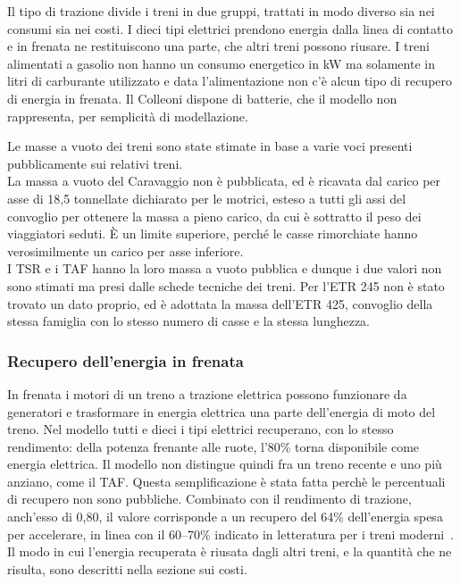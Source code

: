 Il tipo di trazione divide i treni in due gruppi, trattati in modo diverso sia nei consumi sia nei costi. I dieci tipi elettrici prendono energia dalla linea di contatto e in frenata ne restituiscono una parte, che altri treni possono riusare. I treni alimentati a gasolio non hanno un consumo energetico in kW ma solamente in litri di carburante utilizzato e data l'alimentazione non c'è alcun tipo di recupero di energia in frenata. Il Colleoni dispone di batterie, che il modello non rappresenta, per semplicità di modellazione.

Le masse a vuoto dei treni sono state stimate in base a varie voci presenti pubblicamente sui relativi treni.\\
La massa a vuoto del Caravaggio non è pubblicata, ed è ricavata dal carico per asse di 18,5 tonnellate dichiarato per le motrici, esteso a tutti gli assi del convoglio per ottenere la massa a pieno carico, da cui è sottratto il peso dei viaggiatori seduti. È un limite superiore, perché le casse rimorchiate hanno verosimilmente un carico per asse inferiore.\\
I TSR e i TAF hanno la loro massa a vuoto pubblica e dunque i due valori non sono stimati ma presi dalle schede tecniche dei treni.
Per l'ETR 245 non è stato trovato un dato proprio, ed è adottata la massa dell'ETR 425, convoglio della stessa famiglia con lo stesso numero di casse e la stessa lunghezza.

\subsubsection{Recupero dell'energia in frenata}
In frenata i motori di un treno a trazione elettrica possono funzionare da generatori e trasformare in energia elettrica una parte dell'energia di moto del treno. Nel modello tutti e dieci i tipi elettrici recuperano, con lo stesso rendimento: della potenza frenante alle ruote, l'80\% torna disponibile come energia elettrica. Il modello non distingue quindi fra un treno recente e uno più anziano, come il TAF. Questa semplificazione è stata fatta perchè le percentuali di recupero non sono pubbliche. Combinato con il rendimento di trazione, anch'esso di 0,80, il valore corrisponde a un recupero del 64\% dell'energia spesa per accelerare, in linea con il 60--70\% indicato in letteratura per i treni moderni~\cite{andersson2006energy}. Il modo in cui l'energia recuperata è riusata dagli altri treni, e la quantità che ne risulta, sono descritti nella sezione sui costi.\\

